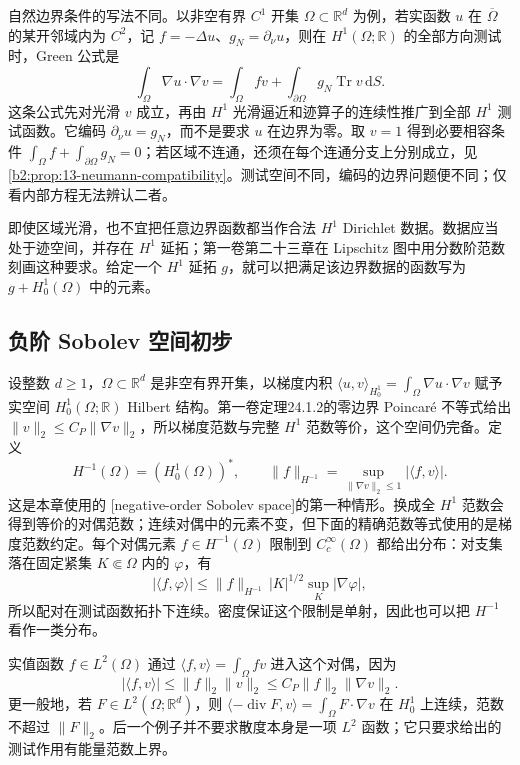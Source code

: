 \ProseParagraphBreak

自然边界条件的写法不同。以非空有界 \(C^1\) 开集 \(\Omega\subset\mathbb R^d\) 为例，若实函数 \(u\) 在 \(\overline\Omega\) 的某开邻域内为 \(C^2\)，记 \(f=-\Delta u\)、\(g_N=\partial_\nu u\)，则在 \(H^1(\Omega;\mathbb R)\) 的全部方向测试时，Green 公式是
\[\int_\Omega\nabla u\cdot\nabla v
  =\int_\Omega fv+\int_{\partial\Omega}g_N\operatorname{Tr}v\,\mathrm dS.\]
这条公式先对光滑 \(v\) 成立，再由 \(H^1\) 光滑逼近和迹算子的连续性推广到全部 \(H^1\) 测试函数。它编码 \(\partial_\nu u=g_N\)，而不是要求 \(u\) 在边界为零。取 \(v=1\) 得到必要相容条件 \(\int_\Omega f+\int_{\partial\Omega}g_N=0\)；若区域不连通，还须在每个连通分支上分别成立，见\cref{b2:prop:13-neumann-compatibility}。测试空间不同，编码的边界问题便不同；仅看内部方程无法辨认二者。

\ProseParagraphBreak

即使区域光滑，也不宜把任意边界函数都当作合法 \(H^1\) Dirichlet 数据。数据应当处于迹空间，并存在 \(H^1\) 延拓；第一卷第二十三章在 Lipschitz 图中用分数阶范数刻画这种要求。给定一个 \(H^1\) 延拓 \(g\)，就可以把满足该边界数据的函数写为 \(g+H_0^1(\Omega)\) 中的元素。

\subsection{负阶 Sobolev 空间初步}
\label{b2:subsec:150104}

设整数 \(d\geq1\)，\(\Omega\subset\mathbb R^d\) 是非空有界开集，以梯度内积
\(\langle u,v\rangle_{H_0^1}=\int_\Omega\nabla u\cdot\nabla v\)
赋予实空间 \(H_0^1(\Omega;\mathbb R)\) Hilbert 结构。第一卷定理24.1.2的零边界 Poincaré 不等式给出
\(\|v\|_2\leq C_P\|\nabla v\|_2\)，所以梯度范数与完整 \(H^1\) 范数等价，这个空间仍完备。定义
\[H^{-1}(\Omega)=(H_0^1(\Omega))^*,\qquad
 \lVert f\rVert_{H^{-1}}=\sup_{\lVert\nabla v\rVert_2\le1}|\langle f,v\rangle|.
\]
这是本章使用的 [negative-order Sobolev space]的第一种情形。换成全 \(H^1\) 范数会得到等价的对偶范数；连续对偶中的元素不变，但下面的精确范数等式使用的是梯度范数约定。每个对偶元素 \(f\in H^{-1}(\Omega)\) 限制到 \(C_c^\infty(\Omega)\) 都给出分布：对支集落在固定紧集 \(K\Subset\Omega\) 内的 \(\varphi\)，有
\[
 |\langle f,\varphi\rangle|
 \leq\|f\|_{H^{-1}}\,|K|^{1/2}\sup_K|\nabla\varphi|,
\]
所以配对在测试函数拓扑下连续。密度保证这个限制是单射，因此也可以把 \(H^{-1}\) 看作一类分布。

实值函数 \(f\in L^2(\Omega)\) 通过 \(\langle f,v\rangle=\int_\Omega fv\) 进入这个对偶，因为
\[
 |\langle f,v\rangle|\leq \|f\|_2\|v\|_2
                 \leq C_P\|f\|_2\|\nabla v\|_2.
\]
更一般地，若 \(F\in L^2(\Omega;\mathbb R^d)\)，则
\(\langle-\operatorname{div}F,v\rangle=\int_\Omega F\cdot\nabla v\)
在 \(H_0^1\) 上连续，范数不超过 \(\|F\|_2\)。后一个例子并不要求散度本身是一项 \(L^2\) 函数；它只要求给出的测试作用有能量范数上界。

